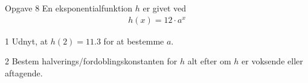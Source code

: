 \newpage
\begin{opgavetekst}{Opgave 8}
	En eksponentialfunktion $h$ er givet ved
	\begin{align*}
		h(x) = 12\cdot a^x
	\end{align*}
\end{opgavetekst}
\begin{delopgave}{}{1}
	Udnyt, at $h(2) = 11.3$ for at bestemme $a$.
\end{delopgave}
\begin{delopgave}{}{2}
	Bestem halverings/fordoblingskonstanten for $h$ alt efter om $h$ er voksende eller aftagende. 
\end{delopgave}
